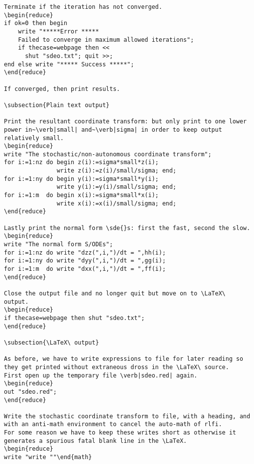 \documentclass[11pt,a5paper]{article}
\begin{document}
\begin{reduce}
\begin{verbatim}
Terminate if the iteration has not converged.
\begin{reduce}
if ok=0 then begin
    write "*****Error *****
    Failed to converge in maximum allowed iterations";
    if thecase=webpage then <<
      shut "sdeo.txt"; quit >>;
end else write "***** Success *****";
\end{reduce}

If converged, then print results.

\subsection{Plain text output}

Print the resultant coordinate transform: but only print to one lower power in~\verb|small| and~\verb|sigma| in order to keep output relatively small.
\begin{reduce}
write "The stochastic/non-autonomous coordinate transform";
for i:=1:nz do begin z(i):=sigma*small*z(i); 
               write z(i):=z(i)/small/sigma; end;
for i:=1:ny do begin y(i):=sigma*small*y(i); 
               write y(i):=y(i)/small/sigma; end;
for i:=1:m  do begin x(i):=sigma*small*x(i); 
               write x(i):=x(i)/small/sigma; end;
\end{reduce}

Lastly print the normal form \sde{}s: first the fast, second the slow.
\begin{reduce}
write "The normal form S/ODEs";
for i:=1:nz do write "dzz(",i,")/dt = ",hh(i);
for i:=1:ny do write "dyy(",i,")/dt = ",gg(i);
for i:=1:m  do write "dxx(",i,")/dt = ",ff(i);
\end{reduce}

Close the output file and no longer quit but move on to \LaTeX\ output.
\begin{reduce}
if thecase=webpage then shut "sdeo.txt"; 
\end{reduce}

\subsection{\LaTeX\ output}

As before, we have to write expressions to file for later reading so they get printed without extraneous dross in the \LaTeX\ source.
First open up the temporary file \verb|sdeo.red| again.
\begin{reduce}
out "sdeo.red";
\end{reduce}

Write the stochastic coordinate transform to file, with a heading, and with an anti-math environment to cancel the auto-math of rlfi.
For some reason we have to keep these writes short as otherwise it generates a spurious fatal blank line in the \LaTeX.
\begin{reduce}
write "write ""\end{math}

\end{verbatim}
\end{reduce}
\end{document}
